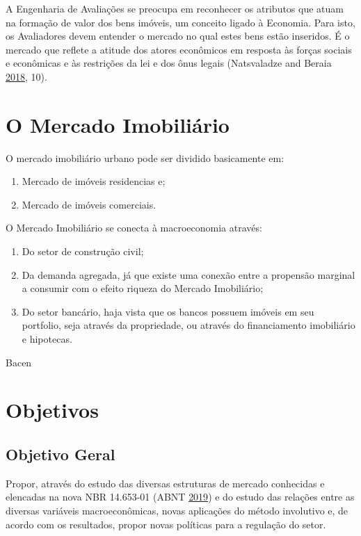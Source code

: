 \documentclass[
	12pt,				%
	oneside,			%
	a4paper,			%
	chapter=TITLE,		%
	section=TITLE,		%
	english,			%
	brazil				%
	]{abntex2}
\begin{document}
A Engenharia de Avaliações se preocupa em reconhecer os atributos que atuam na
formação de valor dos bens imóveis, um conceito ligado à Economia. Para isto, os
Avaliadores devem entender o mercado no qual estes bens estão inseridos. É o
mercado que reflete a atitude dos atores econômicos em resposta às forças
sociais e econômicas e às restrições da lei e dos ônus legais (Natsvaladze and Beraia \protect\hyperlink{ref-realestate}{2018}, 10).

\hypertarget{o-mercado-imobiliuxe1rio}{%
\section{O Mercado Imobiliário}\label{o-mercado-imobiliuxe1rio}}

O mercado imobiliário urbano pode ser dividido basicamente em:
\begin{enumerate}
\def\labelenumi{\arabic{enumi}.}
\tightlist
\item
  Mercado de imóveis residencias e;
\item
  Mercado de imóveis comerciais.
\end{enumerate}
O Mercado Imobiliário se conecta à macroeconomia através:
\begin{enumerate}
\def\labelenumi{\arabic{enumi}.}
\tightlist
\item
  Do setor de construção civil;
\item
  Da demanda agregada, já que existe uma conexão entre a propensão marginal
  a consumir com o efeito riqueza do Mercado Imobiliário;
\item
  Do setor bancário, haja vista que os bancos possuem imóveis em seu portfolio,
  seja através da propriedade, ou através do financiamento imobiliário e hipotecas.
\end{enumerate}
\gls{Bacen}

\hypertarget{objetivos}{%
\section{Objetivos}\label{objetivos}}

\hypertarget{objetivo-geral}{%
\subsection{Objetivo Geral}\label{objetivo-geral}}

Propor, através do estudo das diversas estruturas de mercado conhecidas e
elencadas na nova NBR 14.653-01 (ABNT \protect\hyperlink{ref-NBR1465301}{2019}) e do estudo das relações entre as
diversas variáveis macroeconômicas, novas aplicações do método involutivo e,
de acordo com os resultados, propor novas políticas para a regulação do setor.
\end{document}
